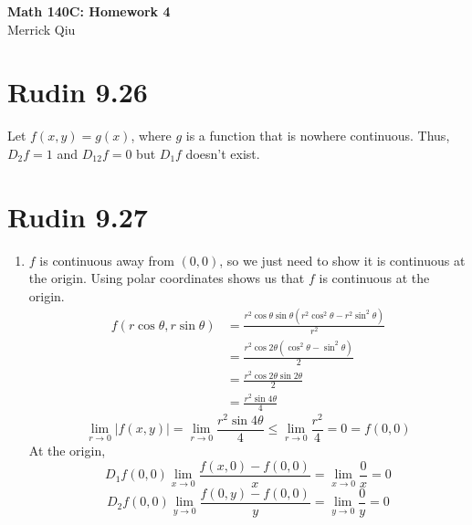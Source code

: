\documentclass{article}
\begin{document}
\begin{center}
	\huge{\bf Math 140C: Homework 4} \\
	Merrick Qiu
\end{center}

\section*{Rudin 9.26}
Let $f(x,y) = g(x)$, where $g$ is a function that is nowhere continuous.
Thus, $D_2 f = 1$ and $D_{1 2} f = 0$ but $D_1 f$ doesn't exist.
\newpage 

\section*{Rudin 9.27}
\begin{enumerate}
  \item $f$ is continuous away from $(0,0)$, so we just need to show it is continuous at the origin.
  Using polar coordinates shows us that $f$ is continuous at the origin.
  \begin{align*}
    f(r\cos \theta, r\sin \theta) &= \frac{r^2\cos \theta \sin \theta (r^2\cos^2 \theta - r^2\sin^2 \theta)}{r^2}\\
    &= \frac{r^2\cos 2\theta (\cos^2 \theta - \sin^2 \theta)}{2}  \\
    &= \frac{r^2\cos 2\theta \sin 2\theta}{2}  \\
    &= \frac{r^2 \sin 4\theta}{4}
  \end{align*}
  \[
    \lim_{r \to 0} |f(x,y)| 
    = \lim_{r \to 0}  \frac{r^2 \sin 4\theta}{4} 
    \leq \lim_{r \to 0}  \frac{r^2}{4} 
    = 0 = f(0,0)
  \]
  At the origin,
  \[
    D_1 f(0,0) \lim_{x \to 0} \frac{f(x,0)- f(0,0)}{x} 
    = \lim_{x \to 0} \frac{0}{x} = 0
  \]
  \[
    D_2 f(0,0) \lim_{y \to 0} \frac{f(0,y)- f(0,0)}{y} 
    = \lim_{y \to 0} \frac{0}{y} = 0
  \]


\end{enumerate}
\end{document}
